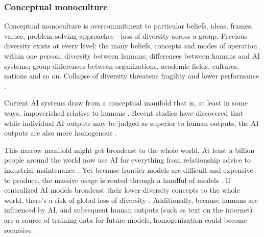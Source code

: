 \documentclass[11pt]{article}
\begin{document}
\subsubsection{Conceptual monoculture}

Conceptual monoculture is overcommitment to particular beliefs, ideas, frames, values, problem-solving approaches---loss of diversity across a group. Precious diversity exists at every level: the many beliefs, concepts and modes of operation within one person; diversity between humans; differences between humans and AI systems; group differences between organizations, academic fields, cultures, nations and so on. Collapse of diversity threatens fragility and lower performance \citep{kleinberg2021algorithmic,scott1998seeing, haldane2013rethinking, page2008difference, march1991exploration}. 

Current AI systems draw from a conceptual manifold that is, at least in some ways, impoverished relative to humans \citep{messeri2024artificial, crawford2021atlas, selwyn2024limits, kirk2023understanding, meincke2025chatgpt}. Recent studies have discovered that while individual AI outputs may be judged as superior to human outputs, the AI outputs are also more homogenous \citep{doshi2024generative, beguvs2024experimental, zhou2024generative, kosmyna2025your, agarwal2025ai, padmakumar2023does, xu2025echoes}. 

This narrow manifold might get broadcast to the whole world. At least a billion people around the world now use AI for everything from relationship advice to industrial maintenance \citep{chatterji2025chatgpt, mckinsey2025stateofai, openai2025enterprise, mccain2025claude, honeywell2024google, techcrunch2025sam, ccia2025survey}. Yet because frontier models are difficult and expensive to produce, the massive usage is routed through a handful of models \citep{bommasani2021opportunities}. If centralized AI models broadcast their lower-diversity concepts to the whole world, there's a risk of global loss of diversity \citep{sourati2026homogenizing, hao2026artificial}. Additionally, because humans are influenced by AI, and subsequent human outputs (such as text on the internet) are a source of training data for future models, homogenization could become recursive \citep{chaney2018algorithmic, osler2026hallucinating}. 


\end{document}
